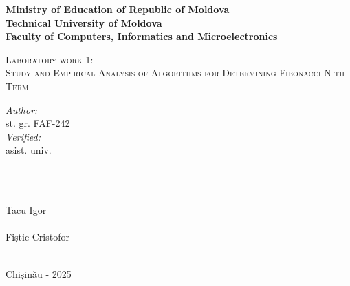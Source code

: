 \documentclass[12pt]{article}
\begin{document}
\begin{titlepage}
   \begin{center}
    \textbf{\large Ministry of Education of Republic of Moldova}\\[0.1cm]
    \textbf{\large Technical University of Moldova}\\[0.1cm]
    \textbf{\large Faculty of Computers, Informatics and Microelectronics}\\[1.2cm]
    
    \vspace{45 mm}
    
    \textsc{\Large Laboratory work 1:}\\[0.1cm]    %
    \textsc{\Large Study and Empirical Analysis of Algorithms for Determining Fibonacci N-th Term }\\[0.4cm]
    
    \vspace{70mm}
    
    \begin{minipage}[t]{0.4\textwidth}
    \begin{flushleft} \large
    \emph{Author:} \\                     
    st. gr. FAF-242 \\
    \emph{Verified:} \\ 
    asist. univ. \\
    \end{flushleft}
    \end{minipage}
    ~
    \begin{minipage}[t]{0.4\textwidth}
    \begin{flushright} \large
    \emph{} \\
    Tacu Igor \\
    \emph{} \\
    Fiștic Cristofor 
    \end{flushright}
    \end{minipage}\\[3cm]
    
    \vspace{5 mm}
    \large Chișinău - 2025\\[0.5cm]
    
    \vfill
    \end{center}
\end{titlepage}
\clearpage
\thispagestyle{empty}
\tableofcontents
\end{document}
